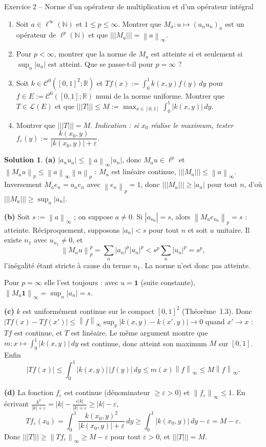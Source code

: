 \documentclass[11pt,a4paper]{article}
\newcommand{\R}{\mathbb{R}}
\newcommand{\N}{\mathbb{N}}
\newcommand{\norm}[1]{\left\|#1\right\|}
\newcommand{\opnorm}[1]{|\!|\!|#1|\!|\!|}
\newcommand{\Lc}{\mathcal{L}}
\newcommand{\Cz}{\mathcal{C}^0}
\theoremstyle{definition}
\newtheorem*{solution}{Solution}
\begin{document}
\begin{exo}{Exercice 2 -- Norme d'un opérateur de multiplication et d'un opérateur intégral}
\begin{enumerate}[label=(\alph*)]
  \item Soit $a\in\ell^\infty(\N)$ et $1\le p\le\infty$. Montrer que $M_a:u\mapsto(a_nu_n)_n$ est un opérateur de $\ell^p(\N)$ et que $\opnorm{M_a}=\norm a_\infty$.
  \item Pour $p<\infty$, montrer que la norme de $M_a$ est atteinte si et seulement si $\sup_n|a_n|$ est atteint. Que se passe-t-il pour $p=\infty$ ?
  \item Soit $k\in\Cz([0,1]^2;\R)$ et $Tf(x):=\int_0^1k(x,y)f(y)\,dy$ pour $f\in E:=\Cz([0,1];\R)$ muni de la norme uniforme. Montrer que $T\in\Lc(E)$ et que $\opnorm T\le M:=\max_{x\in[0,1]}\int_0^1|k(x,y)|\,dy$.
  \item Montrer que $\opnorm T=M$. \emph{Indication : si $x_0$ réalise le maximum, tester $f_\varepsilon(y):=\dfrac{k(x_0,y)}{|k(x_0,y)|+\varepsilon}$.}
\end{enumerate}
\end{exo}

\begin{solution}
\noindent\textbf{(a)} $|a_nu_n|\le\norm a_\infty|u_n|$, donc $M_au\in\ell^p$ et $\norm{M_au}_p\le\norm a_\infty\norm u_p$ : $M_a$ est linéaire continue, $\opnorm{M_a}\le\norm a_\infty$. Inversement $M_ae_n=a_ne_n$ avec $\norm{e_n}_p=1$, donc $\opnorm{M_a}\ge|a_n|$ pour tout $n$, d'où $\opnorm{M_a}\ge\sup_n|a_n|$.

\medskip
\noindent\textbf{(b)} Soit $s:=\norm a_\infty$ ; on suppose $a\ne0$. Si $|a_{n_0}|=s$, alors $\norm{M_ae_{n_0}}_p=s$ : atteinte. Réciproquement, supposons $|a_n|<s$ pour tout $n$ et soit $u$ unitaire. Il existe $n_1$ avec $u_{n_1}\ne0$, et
\[
\norm{M_au}_p^p=\sum_n|a_n|^p|u_n|^p<s^p\sum_n|u_n|^p=s^p,
\]
l'inégalité étant stricte à cause du terme $n_1$. La norme n'est donc pas atteinte.

Pour $p=\infty$ elle l'est toujours : avec $u=\mathbf 1$ (suite constante), $\norm{M_a\mathbf 1}_\infty=\sup_n|a_n|=s$.

\medskip
\noindent\textbf{(c)} $k$ est uniformément continue sur le compact $[0,1]^2$ (Théorème~1.3). Donc $|Tf(x)-Tf(x')|\le\norm f_\infty\sup_y|k(x,y)-k(x',y)|\to0$ quand $x'\to x$ : $Tf$ est continue, et $T$ est linéaire. Le même argument montre que $m:x\mapsto\int_0^1|k(x,y)|\,dy$ est continue, donc atteint son maximum $M$ sur $[0,1]$. Enfin
\[
|Tf(x)|\le\int_0^1|k(x,y)|\,|f(y)|\,dy\le m(x)\norm f_\infty\le M\norm f_\infty .
\]

\medskip
\noindent\textbf{(d)} La fonction $f_\varepsilon$ est continue (dénominateur $\ge\varepsilon>0$) et $\norm{f_\varepsilon}_\infty\le1$. En écrivant $\frac{k^2}{|k|+\varepsilon}=|k|-\frac{\varepsilon|k|}{|k|+\varepsilon}\ge|k|-\varepsilon$,
\[
Tf_\varepsilon(x_0)=\int_0^1\frac{k(x_0,y)^2}{|k(x_0,y)|+\varepsilon}\,dy\ge\int_0^1|k(x_0,y)|\,dy-\varepsilon=M-\varepsilon .
\]
Donc $\opnorm T\ge\norm{Tf_\varepsilon}_\infty\ge M-\varepsilon$ pour tout $\varepsilon>0$, et $\opnorm T=M$.
\end{solution}
\end{document}
